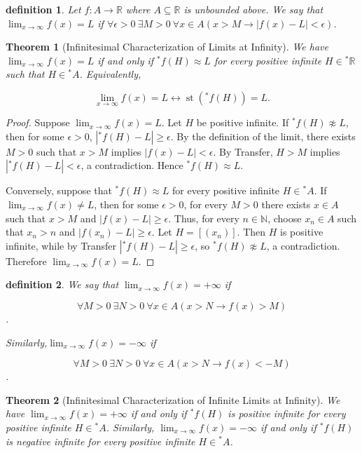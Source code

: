 \documentclass[10pt,a4paper]{book}
\newtheorem{definition}{definition}[section]
\newtheorem{theorem}{Theorem}[section]
\begin{document}
\begin{definition}

    Let $f:A\to\mathbb R$ where $A\subseteq\mathbb R$ is unbounded above. We say
    that $\lim_{x\to\infty}f(x)=L$ if $\forall\epsilon>0\ \exists M>0\ \forall x\in
        A\left(x>M \to |f(x)-L|<\epsilon\right)$.

\end{definition}

\begin{theorem}[Infinitesimal Characterization of Limits at Infinity]

    We have $\lim_{x\to\infty}f(x)=L$ if and only if ${}^*f(H)\approx L$ for every
    positive infinite $H\in{}^*\mathbb R$ such that $H\in{}^*A$. Equivalently,

    $$
        \lim_{x\to\infty}f(x)=L
        \leftrightarrow
        \operatorname{st}({}^*f(H))=L.
    $$

\end{theorem}

\begin{proof}

    Suppose $\lim_{x\to\infty}f(x)=L$. Let $H$ be positive infinite. If
    ${}^*f(H)\not\approx L$, then for some $\epsilon>0$,
    $|{}^*f(H)-L|\geq\epsilon$. By the definition of the limit, there exists $M>0$
    such that $x>M$ implies $|f(x)-L|<\epsilon$. By Transfer, $H>M$ implies
    $|{}^*f(H)-L|<\epsilon$, a contradiction. Hence ${}^*f(H)\approx L$.

    Conversely, suppose that ${}^*f(H)\approx L$ for every positive infinite
    $H\in{}^*A$. If $\lim_{x\to\infty}f(x)\neq L$, then for some $\epsilon>0$, for
    every $M>0$ there exists $x\in A$ such that $x>M$ and $|f(x)-L|\geq\epsilon$.
    Thus, for every $n\in\mathbb N$, choose $x_n\in A$ such that $x_n>n$ and
    $|f(x_n)-L|\geq\epsilon$. Let $H=[(x_n)]$. Then $H$ is positive infinite, while
    by Transfer $|{}^*f(H)-L|\geq\epsilon$, so ${}^*f(H)\not\approx L$, a
    contradiction. Therefore $\lim_{x\to\infty}f(x)=L$.

\end{proof}

\begin{definition}

    We say that $\lim_{x\to\infty}f(x)=+\infty$ if

    $$\forall M>0\ \exists N>0\
        \forall x\in A\left(x>N \to f(x)>M\right)$$.

    Similarly,$\lim_{x\to\infty}f(x)=-\infty$ if

    $$\forall M>0\ \exists N>0\ \forall x\in
        A\left(x>N \to f(x)<-M\right)$$.

\end{definition}
\begin{theorem}[Infinitesimal Characterization of Infinite Limits at Infinity]

    We have $\lim_{x\to\infty}f(x)=+\infty$ if and only if ${}^*f(H)$ is positive
    infinite for every positive infinite $H\in{}^*A$. Similarly,
    $\lim_{x\to\infty}f(x)=-\infty$ if and only if ${}^*f(H)$ is negative infinite
    for every positive infinite $H\in{}^*A$.

\end{theorem}
\end{document}
